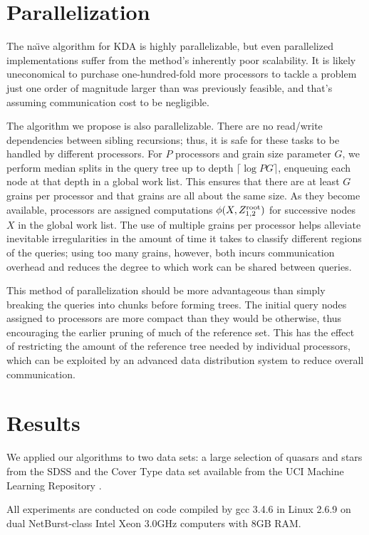 \documentclass[twoside,leqno,twocolumn]{article}
\newcommand{\kdroot}[1]{#1^{\rm root}}
\begin{document}
\section{Parallelization}\label{sec:para}
The na\"{\i}ve algorithm for KDA is highly parallelizable, but even
parallelized implementations suffer from the method's inherently poor
scalability.  It is likely uneconomical to purchase one-hundred-fold
more processors to tackle a problem just one order of magnitude larger
than was previously feasible, and that's assuming communication cost
to be negligible.

The algorithm we propose is also parallelizable.  There are no
read/write dependencies between sibling recursions; thus, it is safe
for these tasks to be handled by different processors.  For $P$
processors and grain size parameter $G$, we perform median splits in
the query tree up to depth $\lceil \log PG \rceil$, enqueuing each
node at that depth in a global work list.  This ensures that there are
at least $G$ grains per processor and that grains are all about the
same size.  As they become available, processors are assigned
computations $\phi(X,\kdroot{Z_{1,2}})$ for successive nodes $X$ in
the global work list.  The use of multiple grains per processor helps
alleviate inevitable irregularities in the amount of time it takes to
classify different regions of the queries; using too many grains,
however, both incurs communication overhead and reduces the degree to
which work can be shared between queries.

This method of parallelization should be more advantageous than simply
breaking the queries into chunks before forming trees.  The initial
query nodes assigned to processors are more compact than they would be
otherwise, thus encouraging the earlier pruning of much of the
reference set.  This has the effect of restricting the amount of the
reference tree needed by individual processors, which can be exploited
by an advanced data distribution system to reduce overall
communication.

\section{Results}\label{sec:res}
We applied our algorithms to two data sets: a large selection of
quasars and stars from the SDSS and the Cover Type data set available
from the UCI Machine Learning Repository \cite{uci-rep}.

All experiments are conducted on code compiled by gcc 3.4.6 in Linux
2.6.9 on dual NetBurst-class Intel Xeon 3.0GHz computers with 8GB RAM.
\end{document}
